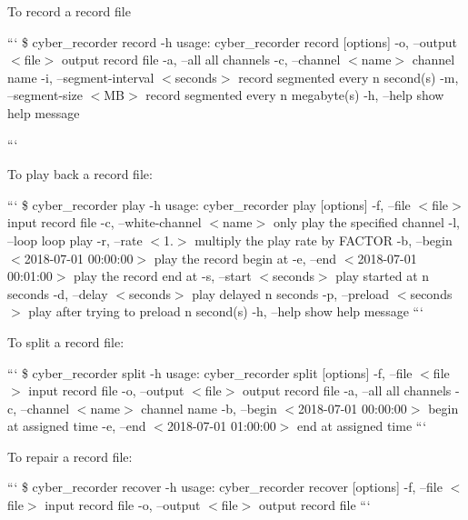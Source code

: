\begin{DoxyItemize}
\item To record a record file
\end{DoxyItemize}

``` \$ cyber\-\_\-recorder record -\/h usage\-: cyber\-\_\-recorder record \mbox{[}options\mbox{]} -\/o, --output $<$file$>$ output record file -\/a, --all all channels -\/c, --channel $<$name$>$ channel name -\/i, --segment-\/interval $<$seconds$>$ record segmented every n second(s) -\/m, --segment-\/size $<$\-M\-B$>$ record segmented every n megabyte(s) -\/h, --help show help message

```


\begin{DoxyItemize}
\item To play back a record file\-:
\end{DoxyItemize}

``` \$ cyber\-\_\-recorder play -\/h usage\-: cyber\-\_\-recorder play \mbox{[}options\mbox{]} -\/f, --file $<$file$>$ input record file -\/c, --white-\/channel $<$name$>$ only play the specified channel -\/l, --loop loop play -\/r, --rate $<$1.$>$ multiply the play rate by F\-A\-C\-T\-O\-R -\/b, --begin $<$2018-\/07-\/01 00\-:00\-:00$>$ play the record begin at -\/e, --end $<$2018-\/07-\/01 00\-:01\-:00$>$ play the record end at -\/s, --start $<$seconds$>$ play started at n seconds -\/d, --delay $<$seconds$>$ play delayed n seconds -\/p, --preload $<$seconds$>$ play after trying to preload n second(s) -\/h, --help show help message ```


\begin{DoxyItemize}
\item To split a record file\-:
\end{DoxyItemize}

``` \$ cyber\-\_\-recorder split -\/h usage\-: cyber\-\_\-recorder split \mbox{[}options\mbox{]} -\/f, --file $<$file$>$ input record file -\/o, --output $<$file$>$ output record file -\/a, --all all channels -\/c, --channel $<$name$>$ channel name -\/b, --begin $<$2018-\/07-\/01 00\-:00\-:00$>$ begin at assigned time -\/e, --end $<$2018-\/07-\/01 01\-:00\-:00$>$ end at assigned time ```


\begin{DoxyItemize}
\item To repair a record file\-:
\end{DoxyItemize}

``` \$ cyber\-\_\-recorder recover -\/h usage\-: cyber\-\_\-recorder recover \mbox{[}options\mbox{]} -\/f, --file $<$file$>$ input record file -\/o, --output $<$file$>$ output record file ```

